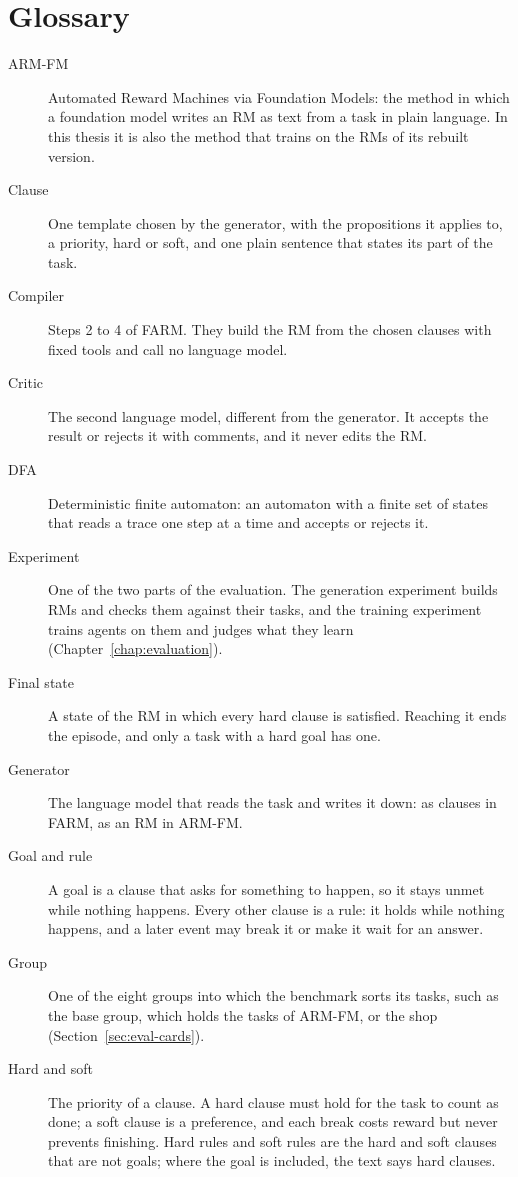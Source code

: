 \documentclass[11pt,english,listoffigures,listoftables]{tfgetsinf}
\begin{document}
\chapter{Glossary}
\begin{description}
    \item[ARM-FM] Automated Reward Machines via Foundation Models: the method in which a foundation model writes an RM as text from a task in plain language. In this thesis it is also the method that trains on the RMs of its rebuilt version.
    \item[Clause] One template chosen by the generator, with the propositions it applies to, a priority, hard or soft, and one plain sentence that states its part of the task.
    \item[Compiler] Steps 2 to 4 of FARM. They build the RM from the chosen clauses with fixed tools and call no language model.
    \item[Critic] The second language model, different from the generator. It accepts the result or rejects it with comments, and it never edits the RM.
    \item[DFA] Deterministic finite automaton: an automaton with a finite set of states that reads a trace one step at a time and accepts or rejects it.
    \item[Experiment] One of the two parts of the evaluation. The generation experiment builds RMs and checks them against their tasks, and the training experiment trains agents on them and judges what they learn (Chapter~\ref{chap:evaluation}).
    \item[Final state] A state of the RM in which every hard clause is satisfied. Reaching it ends the episode, and only a task with a hard goal has one.
    \item[Generator] The language model that reads the task and writes it down: as clauses in FARM, as an RM in ARM-FM.
    \item[Goal and rule] A goal is a clause that asks for something to happen, so it stays unmet while nothing happens. Every other clause is a rule: it holds while nothing happens, and a later event may break it or make it wait for an answer.
    \item[Group] One of the eight groups into which the benchmark sorts its tasks, such as the base group, which holds the tasks of ARM-FM, or the shop (Section~\ref{sec:eval-cards}).
    \item[Hard and soft] The priority of a clause. A hard clause must hold for the task to count as done; a soft clause is a preference, and each break costs reward but never prevents finishing. Hard rules and soft rules are the hard and soft clauses that are not goals; where the goal is included, the text says hard clauses.

\end{description}
\end{document}
